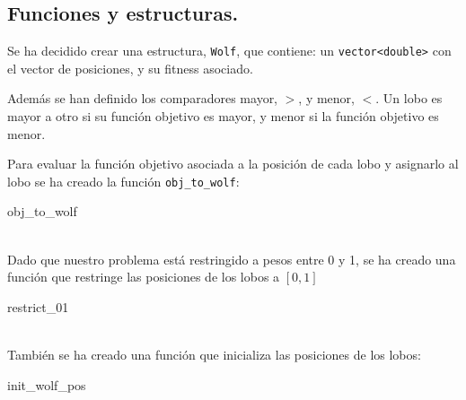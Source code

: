 \documentclass[11pt,a4paper]{article}
\theoremstyle{definition}
\begin{document}
	\subsection{Funciones y estructuras.}
	Se ha decidido crear una estructura, \texttt{Wolf}, que contiene: un \texttt{vector<double>} con el vector de posiciones, y su fitness asociado. 
	
	Además se han definido los comparadores mayor, $>$, y menor, $<$. Un lobo es mayor a otro si su función objetivo es mayor, y menor si la función objetivo es menor.
	
		
	Para evaluar la función objetivo asociada a la posición de cada lobo y asignarlo al lobo se ha creado la función \texttt{obj\_to\_wolf}:\\
		
	\begin{algorithm}[H]
		\caption{obj\_to\_wolf}
	\end{algorithm}~\\
	
	Dado que nuestro problema está restringido a pesos entre 0 y 1, se ha creado una función que restringe las posiciones de los lobos a $[0,1]$\\
		
	\begin{algorithm}[H]
		\caption{restrict\_01}
	\end{algorithm}~\\
	
	También se ha creado una función que inicializa las posiciones de los lobos:\\
		
	\begin{algorithm}[H]
		\caption{init\_wolf\_pos}
	\end{algorithm}~\\
	
\end{document}

